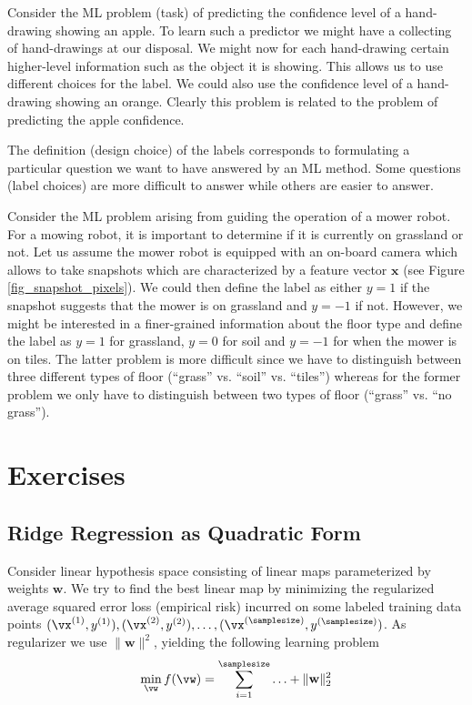 \documentclass[12pt]{report}
\begin{document}
Consider the ML problem (task) of predicting the confidence level of a hand-drawing showing an apple. 
To learn such a predictor we might have a collecting of hand-drawings at our disposal. We might now 
for each hand-drawing certain higher-level information such as the object it is showing. This allows us 
to use different choices for the label. We could also use the confidence level of a hand-drawing showing 
an orange. Clearly this problem is related to the problem of predicting the apple confidence. 


The definition (design choice) of the labels corresponds to formulating a particular question we want to 
have answered by an ML method. Some questions (label choices) are more difficult to answer while 
others are easier to answer. 

Consider the ML problem arising from guiding the operation of a mower robot. For a mowing robot, it is 
important to determine if it is currently on grassland or not. Let us assume the mower robot is equipped 
with an on-board camera which allows to take snapshots which are characterized by a feature vector 
$\mathbf{x}$ (see Figure \ref{fig_snapshot_pixels}). We could then define the label as either $y=1$ 
if the snapshot suggests that the mower is on grassland and $y=-1$ if not. However, we might be 
interested in a finer-grained information about the floor type and define the label as $y=1$ for grassland, 
$y=0$ for soil and $y=-1$ for when the mower is on tiles. The latter problem is more difficult 
since we have to distinguish between three different types of floor (``grass'' vs. ``soil'' vs. ``tiles'') 
whereas for the former problem we only have to distinguish between two types of floor (``grass'' vs. ``no grass''). 


\section{Exercises} 
\subsection{Ridge Regression as Quadratic Form} 
\label{ex_2_0}
Consider linear hypothesis space consisting of linear maps parameterized by 
weights $\mathbf{w}$. We try to find the best linear map by minimizing the regularized average 
squared error loss (empirical risk) incurred on some labeled training data points 
$(\vx^{(1)},y^{(1)}),(\vx^{(2)},y^{(2)}),\ldots,(\vx^{(\samplesize)},y^{(\samplesize)})$. 
As regularizer we use $\| \mathbf{w} \|^{2}$, yielding the following learning problem 
$$ \min_{\vw} f(\vw) = \sum_{i=1}^{\samplesize}\ldots + \| \mathbf{w} \|^{2}_{2}$$
\end{document}
